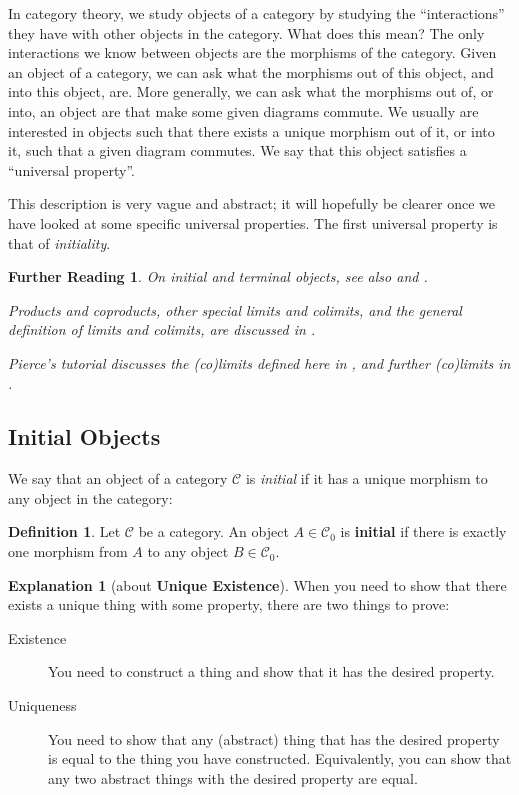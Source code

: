 \documentclass[a4paper,10pt]{scrartcl}
\theoremstyle{plain}
\newtheorem*{reading*}{Further Reading}
\theoremstyle{definition}
\newtheorem{dfn}[thm]{Definition}
\newtheorem{explanation}[thm]{Explanation}
\newcommand{\Cat}[1]{\mathcal{#1}}
\newcommand{\CC}{\Cat{C}}
\newcommand{\Ob}[1]{{#1}_0}
\begin{document}
In category theory, we study objects of a category by studying the ``interactions'' they have with other objects in the category.
What does this mean?
The only interactions we know between objects are the morphisms of the category.
Given an object of a category, we can ask what the morphisms out of this object, and into this object, are.
More generally, we can ask what the morphisms out of, or into, an object are that make some given diagrams commute.
We usually are interested in objects such that there exists a unique morphism out of it, or into it, such that a given diagram commutes.
We say that this object satisfies a ``universal property''.

This description is very vague and abstract; it will hopefully be clearer once we have looked at some specific universal properties.
The first universal property is that of \emph{initiality}.

\begin{reading*}
  On initial and terminal objects, see also \cite[\S 2.7.16]{barr-wells} and \cite[p. 48ff]{leinster}.

  Products and coproducts, other special limits and colimits, and the general definition of limits and colimits, are discussed in \cite[\S\S 5.1, 5.2]{leinster}.

  Pierce's tutorial discusses the (co)limits defined here in \cite[\S\S 2.3--2.4]{pierce}, and further (co)limits in  \cite[\S\S 2.5--2.7]{pierce}.

  
\end{reading*}

\subsection{Initial Objects}
\label{sec:initial-objects}

We say that an object of a category $\CC$ is \emph{initial} if it has a unique morphism to any object in the category:

\begin{dfn}
  Let $\CC$ be a category. An object $A \in \Ob{\CC}$ is \textbf{initial} if there is exactly one morphism from $A$ to any object $B \in \Ob{\CC}$.
\end{dfn}

\begin{explanation}[about \textbf{Unique Existence}]
  When you need to show that there exists a unique thing with some property, there are two things to prove:
  \begin{description}
  \item[Existence] You need to construct a thing and show that it has the desired property.
  \item[Uniqueness] You need to show that any (abstract) thing that has the desired property is equal to the thing you have constructed. Equivalently, you can show that any two abstract things with the desired property are equal.
  \end{description}
\end{explanation}
\end{document}

